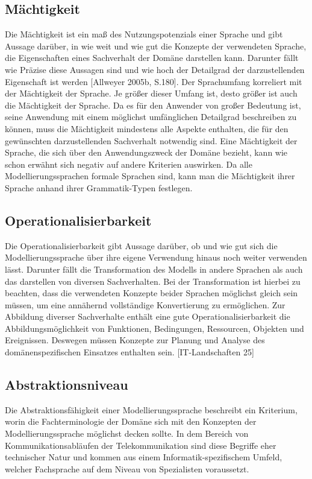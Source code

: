 \subsection{Mächtigkeit}
\label{ssc:Nutzungspotenzial}
Die Mächtigkeit ist ein maß des Nutzungspotenzials einer Sprache und gibt Aussage darüber,
in wie weit und wie gut die Konzepte der verwendeten Sprache, die Eigenschaften eines Sachverhalt der Domäne darstellen kann.
Darunter fällt wie Präzise diese Aussagen sind und wie hoch der Detailgrad der darzustellenden Eigenschaft ist werden [Allweyer 2005b, S.180].
Der Sprachumfang korreliert mit der Mächtigkeit der Sprache. Je größer dieser Umfang ist, desto größer ist auch die Mächtigkeit der Sprache.
Da es für den Anwender von großer Bedeutung ist, seine Anwendung mit einem möglichst umfänglichen Detailgrad beschreiben zu können,
muss die Mächtigkeit mindestens alle Aspekte enthalten, die für den gewünschten darzustellenden Sachverhalt notwendig sind.
Eine Mächtigkeit der Sprache, die sich über den Anwendungszweck der Domäne bezieht, kann wie schon erwähnt sich negativ auf andere Kriterien auswirken.
Da alle Modellierungssprachen formale Sprachen sind, kann man die Mächtigkeit ihrer Sprache anhand ihrer Grammatik-Typen festlegen.

\subsection{Operationalisierbarkeit}
\label{ssc:Operationalisierbarkeit}
Die Operationalisierbarkeit gibt Aussage darüber, ob und wie gut sich die Modellierungssprache über ihre eigene Verwendung hinaus noch weiter verwenden lässt.
Darunter fällt die Transformation des Modells in andere Sprachen als auch das darstellen von diversen Sachverhalten.
Bei der Transformation ist hierbei zu beachten, dass die verwendeten Konzepte beider Sprachen möglichst gleich sein müssen,
um eine annähernd vollständige Konvertierung zu ermöglichen. Zur Abbildung diverser Sachverhalte enthält eine gute Operationalisierbarkeit die Abbildungsmöglichkeit von Funktionen, Bedingungen, Ressourcen, Objekten und Ereignissen.
Deswegen müssen Konzepte zur Planung und Analyse des domänenspezifischen Einsatzes enthalten sein.
[IT-Landschaften 25]

\subsection{Abstraktionsniveau}
\label{ssc:Abstraktionsniveau}
Die Abstraktionsfähigkeit einer Modellierungssprache beschreibt ein Kriterium, worin die Fachterminologie der Domäne sich mit den Konzepten der Modellierungssprache möglichst decken sollte. In dem Bereich von Kommunikationsabläufen der Telekommunikation sind diese Begriffe eher technischer Natur und kommen aus einem Informatik-spezifischem Umfeld, welcher Fachsprache auf dem Niveau von Spezialisten voraussetzt. 

